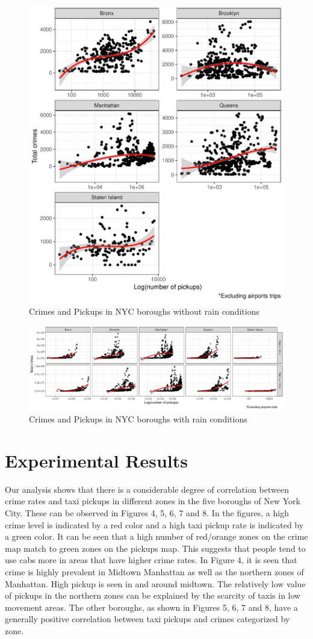 \documentclass{sigkddExp}
\begin{document}
\begin{figure}
    \centering
    \includegraphics[width=.5\textwidth]{../img/scatter_crimes_taxis.pdf}
    \caption{Crimes and Pickups in NYC boroughs without rain conditions}
    \label{Staten Island}
  \end{figure}


\begin{figure}
    \centering
    \includegraphics[width=1\textwidth]{../img/scatter_crimes_taxis_rain.pdf}
    \caption{Crimes and Pickups in NYC boroughs with rain conditions}
    \label{Staten Island}
\end{figure}

\section{Experimental Results}
Our analysis shows that there is a considerable degree of correlation between crime rates and taxi pickups in different zones in the five boroughs of New York City. These can be observed in Figures 4, 5, 6, 7 and 8. In the figures, a high crime level is indicated by a red color and a high taxi pickup rate is indicated by a green color. It can be seen that a high number of red/orange zones on the crime map match to green zones on the pickups map. This suggests that people tend to use cabs more in areas that have higher crime rates. In Figure 4, it is seen that crime is highly prevalent in Midtown Manhattan as well as the northern zones of Manhattan. High pickup is seen in and around midtown. The relatively low value of pickups in the northern zones can be explained by the scarcity of taxis in low movement areas. The other boroughs, as shown in Figures 5, 6, 7 and 8, have a generally positive correlation between taxi pickups and crimes categorized by zone. 
\end{document}
